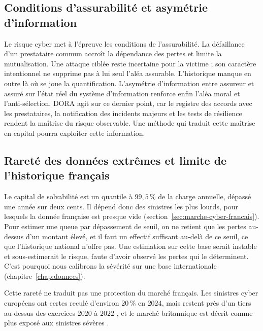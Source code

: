 \subsection{Conditions d'assurabilité et asymétrie d'information}
\label{subsec:dependance-accumulation}

Le risque cyber met à l'épreuve les conditions de l'assurabilité. La défaillance d'un prestataire commun accroît la dépendance des pertes et limite la mutualisation. Une attaque ciblée reste incertaine pour la victime ; son caractère intentionnel ne supprime pas à lui seul l'aléa assurable. L'historique
manque en outre là où se joue la quantification. L'asymétrie d'information entre assureur et assuré sur
l'état réel du système d'information renforce enfin l'aléa moral et l'anti-sélection. DORA agit sur
ce dernier point, car le registre des accords avec les prestataires, la notification des incidents
majeurs et les tests de résilience rendent la maîtrise du risque observable. Une méthode qui traduit
cette maîtrise en capital pourra exploiter cette information.

\subsection{Rareté des données extrêmes et limite de l'historique français}
\label{subsec:donnees-extremes}

Le capital de solvabilité est un quantile à $99{,}5\,\%$ de la charge annuelle, dépassé une année
sur deux cents. Il dépend donc des sinistres les plus lourds, pour lesquels la donnée française est
presque vide (section~\ref{sec:marche-cyber-francais}). Pour estimer une queue par dépassement de
seuil, on ne retient que les pertes au-dessus d'un montant élevé, et il faut un effectif suffisant
au-delà de ce seuil, ce que l'historique national n'offre pas. Une estimation sur cette base serait
instable et sous-estimerait le risque, faute d'avoir observé les pertes qui le déterminent. C'est
pourquoi nous calibrons la sévérité sur une base internationale (chapitre~\ref{chap:donnees}).

Cette rareté ne traduit pas une protection du marché français. Les sinistres cyber européens
ont certes reculé d'environ $20\,\%$ en $2024$, mais restent près d'un tiers au-dessus des exercices
$2020$ à $2022$ \citep{marsh2025}, et le marché britannique est décrit comme plus exposé aux
sinistres sévères \citep{dsit2025}.

